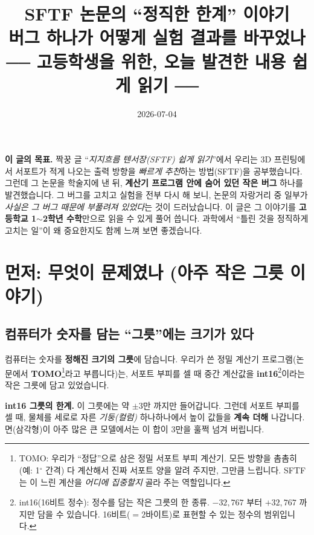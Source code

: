 \documentclass[11pt,a4paper]{article}
\title{\textbf{SFTF 논문의 ``정직한 한계'' 이야기}\\[4pt]
\large 버그 하나가 어떻게 실험 결과를 바꾸었나\\[2pt]
\normalsize ── 고등학생을 위한, 오늘 발견한 내용 쉽게 읽기 ──}
\author{}
\date{2026-07-04}
\begin{document}
\maketitle

\begin{readbox}
\textbf{이 글의 목표.} 짝꿍 글 ``\emph{지지흐름 텐서장(SFTF) 쉽게 읽기}''에서 우리는
3D 프린팅에서 서포트가 적게 나오는 출력 방향을 \emph{빠르게 추천}하는 방법(SFTF)을
공부했습니다. 그런데 그 논문을 학술지에 낸 뒤, \textbf{계산기 프로그램 안에 숨어 있던
작은 버그} 하나를 발견했습니다. 그 버그를 고치고 실험을 전부 다시 해 보니, 논문의
자랑거리 중 일부가 \emph{사실은 그 버그 때문에 부풀려져 있었다}는 것이 드러났습니다.
이 글은 그 이야기를 \textbf{고등학교 1$\sim$2학년 수학}만으로 읽을 수 있게 풀어 씁니다.
과학에서 ``틀린 것을 정직하게 고치는 일''이 왜 중요한지도 함께 느껴 보면 좋겠습니다.
\end{readbox}

\tableofcontents
\bigskip

\section{먼저: 무엇이 문제였나 (아주 작은 그릇 이야기)}

\subsection{컴퓨터가 숫자를 담는 ``그릇''에는 크기가 있다}

컴퓨터는 숫자를 \textbf{정해진 크기의 그릇}에 담습니다. 우리가 쓴 정밀 계산기
프로그램(논문에서 \textbf{TOMO}\footnote{TOMO: 우리가 ``정답''으로 삼은 정밀 서포트
부피 계산기. 모든 방향을 촘촘히(예: 1$^\circ$ 간격) 다 계산해서 진짜 서포트 양을
알려 주지만, 그만큼 느립니다. SFTF는 이 느린 계산을 \emph{어디에 집중할지} 골라 주는
역할입니다.}라고 부릅니다)는, 서포트 부피를 셀 때 중간 계산값을
\textbf{int16}\footnote{int16(16비트 정수): 정수를 담는 작은 그릇의 한 종류.
$-32{,}767$ 부터 $+32{,}767$ 까지만 담을 수 있습니다. 16비트($=2$바이트)로 표현할 수
있는 정수의 범위입니다.}이라는 작은 그릇에 담고 있었습니다.

\begin{notebox}
\textbf{int16 그릇의 한계.} 이 그릇에는 약 $\pm 3$만 까지만 들어갑니다. 그런데
서포트 부피를 셀 때, 물체를 세로로 자른 \emph{기둥(컬럼)} 하나하나에서 높이 값들을
\textbf{계속 더해} 나갑니다. 면(삼각형)이 아주 많은 큰 모델에서는 이 합이 $3$만을
훌쩍 넘겨 버립니다.
\end{notebox}
\end{document}
